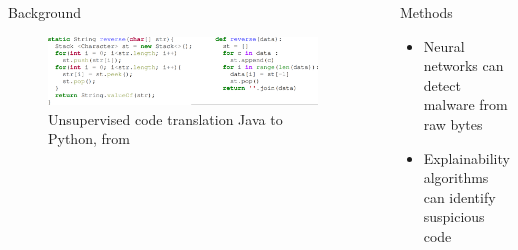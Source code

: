 \documentclass[final,10pt]{beamer}
\newlength{\sepwidth}
\newlength{\colwidth}
\newcommand{\separatorcolumn}{\begin{column}{\sepwidth}\end{column}}
\begin{document}
\begin{frame}[t]
\begin{columns}[t]
\begin{column}{\colwidth}
\begin{block}{Background}
	\begin{figure}
		\begin{center}
			\includegraphics[scale=.34]{./figures/Code_Translation.png}
		\end{center}
		\caption{Unsupervised code translation Java to Python, from \cite{roziere2021leveraging}}
		\label{fig:CodeTranslation}
	\end{figure}

	\end{block}

\end{column}

\separatorcolumn

\begin{column}{\colwidth}

	\begin{block}{Methods}
		

		\begin{itemize}
			\item Neural networks can detect malware from raw bytes
			\item Explainability algorithms can identify suspicious code
		\end{itemize}
		

\end{block}
\end{column}
\end{columns}
\end{frame}
\end{document}
